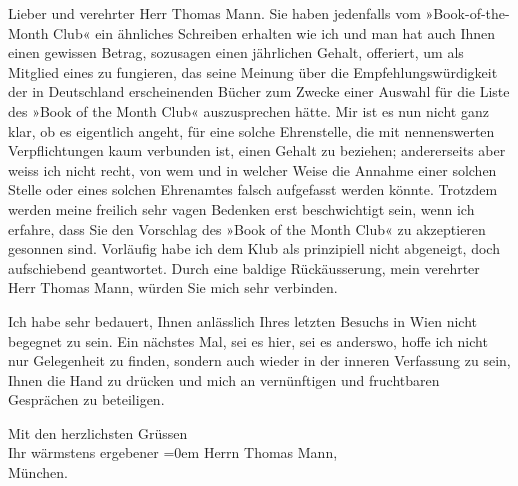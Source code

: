 \pstart{}Lieber und verehrter Herr Thomas Mann.\pend\vspace{0.5em}
\pstart
           Sie haben jedenfalls vom »Book-of-the-Month Club«
               ein ähnliches Schreiben erhalten wie ich und man hat auch Ihnen einen gewissen
               Betrag, sozusagen einen jährlichen Gehalt, offeriert, um als Mitglied eines \label{T_L02507-1v}\label{T_L02507-1}
               zu fungieren, das seine Meinung über die Empfehlungswürdigkeit der in Deutschland erscheinenden Bücher zum Zwecke einer
               Auswahl für die Liste des »Book of the Month
               Club« auszusprechen hätte. Mir ist es nun nicht ganz klar, ob es eigentlich
               angeht, für eine solche Ehrenstelle, die mit nennenswerten Verpflichtungen kaum
               verbunden ist, einen Gehalt zu beziehen; andererseits aber weiss ich nicht recht, von
               wem und in welcher Weise die Annahme einer solchen Stelle oder eines solchen
               Ehrenamtes falsch aufgefasst werden könnte. Trotzdem werden meine freilich sehr vagen
               Bedenken erst beschwichtigt sein, wenn ich erfahre, dass Sie den Vorschlag des »Book of the Month Club« zu akzeptieren gesonnen
               sind. Vorläufig habe ich dem Klub als prinzipiell nicht abgeneigt, doch aufschiebend
               geantwortet. Durch eine baldige Rückäusserung, mein verehrter Herr Thomas Mann,
               würden Sie mich sehr verbinden.\pend
           
\pstart
           Ich habe sehr bedauert\introOben{},\introOben{} Ihnen anlässlich Ihres letzten
               Besuchs in Wien nicht begegnet zu sein. Ein
               nächstes Mal, sei es hier, sei es anderswo, hoffe ich nicht nur Gelegenheit zu finden, sondern auch  wieder in der inneren Verfassung zu sein\introOben{},\introOben{}
               Ihnen die Hand zu drücken und mich an vernünftigen und fruchtbaren Gesprächen zu
               beteiligen.\pend
           
\pstart
           Mit den herzlichsten Grüssen{\\[\baselineskip]}Ihr wärmstens ergebener\pend
           \leftskip=0em{}{\vspace{1\baselineskip}}
\pstart
           \noindent{}Herrn Thomas Mann,{\\}München.\pend
           \endnumbering{}  \newcommand{\dateiname}{L02507}\newcommand{\titel}{Arthur Schnitzler an Thomas Mann, 30. 1. 1929}\newcommand{\editorInnen}{Martin Anton Müller und Gerd-Hermann Susen}
